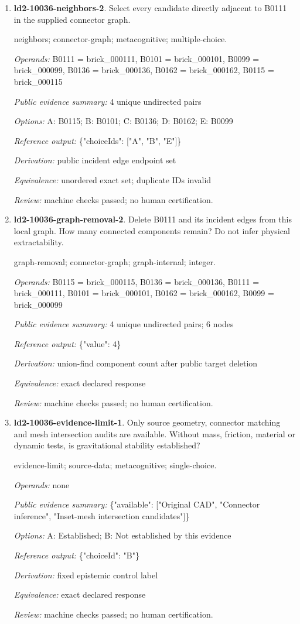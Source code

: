 \begin{enumerate}
\item \textbf{ld2-10036-neighbors-2}. Select every candidate directly adjacent to B0111 in the supplied connector graph.
\par{\small neighbors; connector-graph; metacognitive; multiple-choice.\par\textit{Operands:} B0111 = brick\_000111, B0101 = brick\_000101, B0099 = brick\_000099, B0136 = brick\_000136, B0162 = brick\_000162, B0115 = brick\_000115\par\textit{Public evidence summary:} 4 unique undirected pairs\par\textit{Options:} A: B0115; B: B0101; C: B0136; D: B0162; E: B0099\par\textit{Reference output:} \{"choiceIds": ["A", "B", "E"]\}\par\textit{Derivation:} public incident edge endpoint set\par\textit{Equivalence:} unordered exact set; duplicate IDs invalid\par\textit{Review:} machine checks passed; no human certification.}
\item \textbf{ld2-10036-graph-removal-2}. Delete B0111 and its incident edges from this local graph. How many connected components remain? Do not infer physical extractability.
\par{\small graph-removal; connector-graph; graph-internal; integer.\par\textit{Operands:} B0115 = brick\_000115, B0136 = brick\_000136, B0111 = brick\_000111, B0101 = brick\_000101, B0162 = brick\_000162, B0099 = brick\_000099\par\textit{Public evidence summary:} 4 unique undirected pairs; 6 nodes\par\textit{Reference output:} \{"value": 4\}\par\textit{Derivation:} union-find component count after public target deletion\par\textit{Equivalence:} exact declared response\par\textit{Review:} machine checks passed; no human certification.}
\item \textbf{ld2-10036-evidence-limit-1}. Only source geometry, connector matching and mesh intersection audits are available. Without mass, friction, material or dynamic tests, is gravitational stability established?
\par{\small evidence-limit; source-data; metacognitive; single-choice.\par\textit{Operands:} none\par\textit{Public evidence summary:} \{"available": ["Original CAD", "Connector inference", "Inset-mesh intersection candidates"]\}\par\textit{Options:} A: Established; B: Not established by this evidence\par\textit{Reference output:} \{"choiceId": "B"\}\par\textit{Derivation:} fixed epistemic control label\par\textit{Equivalence:} exact declared response\par\textit{Review:} machine checks passed; no human certification.}

\end{enumerate}

